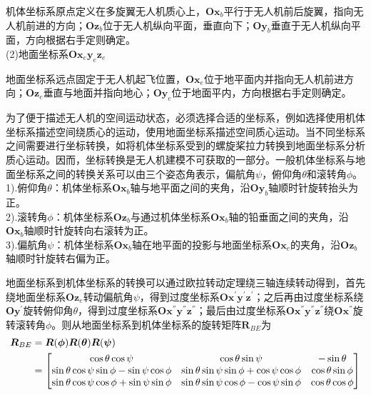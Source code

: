 机体坐标系原点定义在多旋翼无人机质心上，$\boldsymbol{O} \boldsymbol{x}_b$平行于无人机前后旋翼，指向无人机前进的方向；$\boldsymbol{O} \boldsymbol{z}_b$位于无人机纵向平面，垂直向下；$\boldsymbol{O} \boldsymbol{y}_b$垂直于无人机纵向平面，方向根据右手定则确定。 \\ 
(2)地面坐标系$\boldsymbol{O} \boldsymbol{x}_e \boldsymbol{y}_e \boldsymbol{z}_e$

地面坐标系远点固定于无人机起飞位置，$\boldsymbol{O} \boldsymbol{x}_e$位于地平面内并指向无人机前进方向；$\boldsymbol{O} \boldsymbol{z}_e$垂直与地面并指向地心；$\boldsymbol{O} \boldsymbol{y}_e$位于地面平内，方向根据右手定则确定。

为了便于描述无人机的空间运动状态，必须选择合适的坐标系，例如选择使用机体坐标系描述空间绕质心的运动，使用地面坐标系描述空间质心运动。当不同坐标系之间需要进行坐标转换，如将机体坐标系受到的螺旋桨拉力转换到地面坐标系分析质心运动。因而，坐标转换是无人机建模不可获取的一部分。一般机体坐标系与地面坐标系之间的转换关系可以由三个姿态角表示，偏航角$\psi$，俯仰角$\theta$和滚转角$\phi$。\\
1).俯仰角$\theta$：机体坐标系$\boldsymbol{O} \boldsymbol{x}_b$轴与地平面之间的夹角，沿$\boldsymbol{O} \boldsymbol{y}_b$轴顺时针旋转抬头为正。\\
2).滚转角$\phi$：机体坐标系$\boldsymbol{O} \boldsymbol{z}_b$与通过机体坐标系$\boldsymbol{O} \boldsymbol{x}_b$轴的铅垂面之间的夹角，沿$\boldsymbol{O} \boldsymbol{x}_b$轴顺时针旋转向右滚转为正。\\
3).偏航角$\psi$：机体坐标系$\boldsymbol{O} \boldsymbol{x}_b$轴在地平面的投影与地面坐标系$\boldsymbol{O} \boldsymbol{x}_e$的夹角，沿$\boldsymbol{O} \boldsymbol{z}_b$轴顺时针旋转右偏为正。

地面坐标系到机体坐标系的转换可以通过欧拉转动定理绕三轴连续转动得到，首先绕地面坐标系$\boldsymbol{O} \boldsymbol{z}_e$转动偏航角$\psi$，得到过度坐标系$\boldsymbol{O} \boldsymbol{x}^{'} \boldsymbol{y}^{'} \boldsymbol{z}^{'}$；之后再由过度坐标系绕$\boldsymbol{O} \boldsymbol{y}^{'}$旋转俯仰角$\theta$，得到过度坐标系$\boldsymbol{O} \boldsymbol{x}^{''} \boldsymbol{y}^{''} \boldsymbol{z}^{''}$；最后由过度坐标系$\boldsymbol{O} \boldsymbol{x}^{''} \boldsymbol{y}^{''} \boldsymbol{z}^{''}$绕$\boldsymbol{O} \boldsymbol{x}^{''}$旋转滚转角$\phi$。则从地面坐标系到机体坐标系的旋转矩阵$\boldsymbol{R}_{BE}$为
\begin{equation}
\label{equ2.1}
\begin{aligned}
\boldsymbol{R}_{BE} 
&= \boldsymbol{R}(\boldsymbol{\phi}) \boldsymbol{R}(\boldsymbol{\theta}) \boldsymbol{R}(\boldsymbol{\psi}) \\ 
&= 
\begin{bmatrix}
\cos\theta \cos\psi & \cos\theta \sin\psi & -\sin\theta \cr
\sin\theta \cos\psi \sin\phi - \sin\psi \cos\phi & \sin\theta \sin\psi \sin\phi + \cos\psi \cos\phi & \cos\theta \sin\phi \cr
\sin\theta \cos\psi \cos\phi + \sin\psi \sin\phi & \sin\theta \sin\psi \cos\phi - \cos\psi \sin\phi & \cos\theta \cos\phi \cr
\end{bmatrix}
\end{aligned}
\end{equation}

